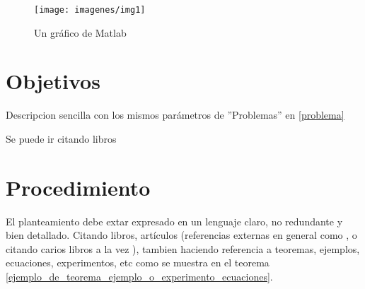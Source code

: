 \documentclass[a4paper]{IEEEtran} %
\begin{document}
\begin{figure} %
    \centering %
        \texttt{[image: imagenes/img1]} %
        \caption{Un gráfico de Matlab} %
        \label{img1} %
\end{figure} %


\section{Objetivos}

Descripcion sencilla con los mismos parámetros de ''Problemas''  en \eqref{problema} %

Se puede ir citando libros \cite{libro2, libro3}


\section{Procedimiento}
\label{procedimiento}

El planteamiento debe extar expresado en un lenguaje claro, no redundante y bien detallado. Citando libros, artículos (referencias externas en general como \cite{libro1} , o citando carios libros a la vez \cite{libro4, libro5, libro6}), tambien haciendo referencia a teoremas, ejemplos, ecuaciones, experimentos, etc como se muestra en el teorema \eqref{ejemplo_de_teorema_ejemplo_o_experimento_ecuaciones}.
\end{document}

